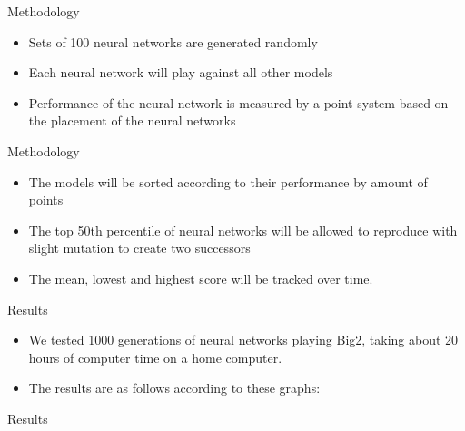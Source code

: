 \documentclass{beamer}
\begin{document}
\begin{frame}{Methodology}
	
	\begin{itemize}
	
		\item Sets of 100 neural networks are generated randomly
		\item Each neural network will play against all other models
		\item Performance of the neural network is measured by a point system based on the placement of the neural networks
		
	\end{itemize}
	
\end{frame}

\begin{frame}{Methodology}
	
	\begin{itemize}
		
		\item The models will be sorted according to their performance by amount of points
		\item The top 50th percentile of neural networks will be allowed to reproduce with slight mutation to create two successors
		\item The mean, lowest and highest score will be tracked over time.
		
	\end{itemize}
	
\end{frame}

\begin{frame}{Results}
	
	\begin{itemize}
		\item We tested 1000 generations of neural networks playing Big2, taking about 20 hours of computer time on a home computer.
		\item The results are as follows according to these graphs:
	\end{itemize}
	
\end{frame}

\begin{frame}{Results}
\end{frame}
\end{document}
